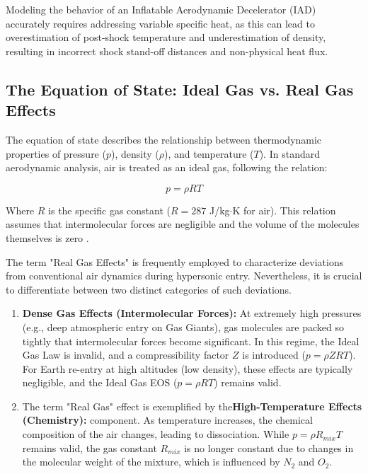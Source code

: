 Modeling the behavior of an Inflatable Aerodynamic Decelerator (IAD) accurately requires addressing variable specific heat, as this can lead to overestimation of post-shock temperature and underestimation of density, resulting in incorrect shock stand-off distances and non-physical heat flux.


\subsection{The Equation of State: Ideal Gas vs. Real Gas Effects}

\par
The equation of state describes the relationship between thermodynamic properties of pressure ($p$), density ($\rho$), and temperature ($T$). In standard aerodynamic analysis, air is treated as an ideal gas, following the relation:

\begin{equation}
    p = \rho R T
\end{equation}

Where $R$ is the specific gas constant ($R = 287$ J/kg$\cdot$K for air). This relation assumes that intermolecular forces are negligible and the volume of the molecules themselves is zero \cite{AndersonHypersonic}.



The term "Real Gas Effects" is frequently employed to characterize deviations from conventional air dynamics during hypersonic entry. Nevertheless, it is crucial to differentiate between two distinct categories of such deviations.

\begin{enumerate}
    \item \textbf{Dense Gas Effects (Intermolecular Forces):} At extremely high pressures (e.g., deep atmospheric entry on Gas Giants), gas molecules are packed so tightly that intermolecular forces become significant. In this regime, the Ideal Gas Law is invalid, and a compressibility factor $Z$ is introduced ($p = \rho Z R T$). For Earth re-entry at high altitudes (low density), these effects are typically negligible, and the Ideal Gas EOS ($p = \rho R T$) remains valid.

    \item The term "Real Gas" effect is exemplified by the\textbf{High-Temperature Effects (Chemistry):} component. As temperature increases, the chemical composition of the air changes, leading to dissociation. While $p = \rho R_{mix} T$ remains valid, the gas constant $R_{mix}$ is no longer constant due to changes in the molecular weight of the mixture, which is influenced by $N_2$ and $O_2$.
\end{enumerate}

